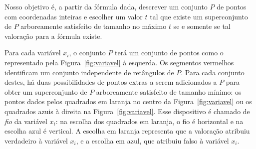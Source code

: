 Nosso objetivo é, a partir da fórmula dada, descrever um conjunto $P$ de pontos com coordenadas inteiras e escolher um valor $t$ tal que existe um superconjunto de $P$ arboreamente satisfeito de tamanho no máximo $t$ se e somente se tal valoração para a fórmula existe.

Para cada variável $x_i$, o conjunto $P$ terá um conjunto de pontos como o representado pela Figura~\ref{fig:variavel} à esquerda. Os segmentos vermelhos identificam um conjunto independente de retângulos de $P$. Para cada conjunto destes, há duas possibilidades de pontos extras a serem adicionados a $P$ para obter um superconjunto de $P$ arboreamente satisfeito de tamanho mínimo: os pontos dados pelos quadrados em laranja no centro da Figura~\ref{fig:variavel} ou os quadrados azuis à direita na Figura~\ref{fig:variavel}. Esse dispositivo é chamado de \textit{fio} da variável $x_i$: na escolha dos quadrados em laranja, o fio é horizontal e na escolha azul é vertical. A escolha em laranja representa que a valoração atribuiu verdadeiro à variável $x_i$, e a escolha em azul, que atribuiu falso à variável $x_i$. 

